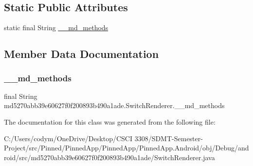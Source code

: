 \subsection*{Static Public Attributes}
\begin{DoxyCompactItemize}
\item 
static final String \hyperlink{classmd5270abb39e60627f0f200893b490a1ade_1_1_switch_renderer_a70baf7daa85c86b196cc9c27e5478a8c}{\+\_\+\+\_\+md\+\_\+methods}
\end{DoxyCompactItemize}


\subsection{Member Data Documentation}
\mbox{\label{classmd5270abb39e60627f0f200893b490a1ade_1_1_switch_renderer_a70baf7daa85c86b196cc9c27e5478a8c}} 
\subsubsection{\texorpdfstring{\+\_\+\+\_\+md\+\_\+methods}{\_\_md\_methods}}
{\footnotesize\ttfamily final String md5270abb39e60627f0f200893b490a1ade.\+Switch\+Renderer.\+\_\+\+\_\+md\+\_\+methods\hspace{0.3cm}{\ttfamily [static]}}



The documentation for this class was generated from the following file\+:\begin{DoxyCompactItemize}
\item 
C\+:/\+Users/codym/\+One\+Drive/\+Desktop/\+C\+S\+C\+I 3308/\+S\+D\+M\+T-\/\+Semester-\/\+Project/src/\+Pinned/\+Pinned\+App/\+Pinned\+App/\+Pinned\+App.\+Android/obj/\+Debug/android/src/md5270abb39e60627f0f200893b490a1ade/Switch\+Renderer.\+java\end{DoxyCompactItemize}
